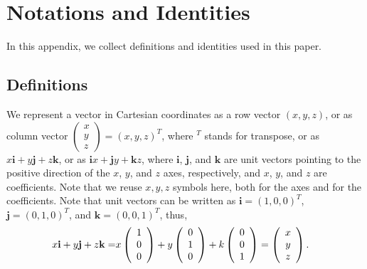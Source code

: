 \documentclass[11pt]{article}              %
\begin{document}

\appendix
\section{Notations and Identities}
\renewcommand{\theequation}{A.\arabic{equation}}
\setcounter{equation}{0}
In this appendix, we collect definitions and identities used in this paper. 

\subsection*{Definitions} 
We represent a vector in Cartesian coordinates as a row vector $(x,y,z)$, or as column vector $\left(\begin{array}{c}x\\y\\z\end{array}\right)=(x,y,z)^T$, where $^T$ stands for transpose, or as $x{\mathbf i}+y{\mathbf j}+z{\mathbf k}$, or as ${\mathbf i}x+{\mathbf j}y+{\mathbf k}z$, where ${\mathbf i}$, ${\mathbf j}$, and ${\mathbf k}$ are unit vectors pointing to the positive direction of the $x$, $y$, and $z$ axes, respectively, and $x$, $y$, and $z$ are coefficients. Note that we reuse $x,y,z$ symbols here, both for the axes and for the coefficients. Note that unit vectors can be written as ${\mathbf i}=(1,0,0)^T$, ${\mathbf j}=(0,1,0)^T$, and ${\mathbf k}=(0,0,1)^T$, thus,
\begin{align}
    x{\mathbf i}+y{\mathbf j}+z{\mathbf k}=&x\left(\begin{array}{c}1\\0\\0\end{array}\right)+y\left(\begin{array}{c}0\\1\\0\end{array}\right)+k\left(\begin{array}{c}0\\0\\1\end{array}\right)=\left(\begin{array}{c}x\\y\\z\end{array}\right).\notag
\end{align}
\end{document}
